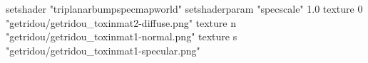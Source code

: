 setshader "triplanarbumpspecmapworld"
setshaderparam "specscale" 1.0
texture 0 "getridou/getridou_toxinmat2-diffuse.png"
texture n "getridou/getridou_toxinmat1-normal.png"
texture s "getridou/getridou_toxinmat1-specular.png"